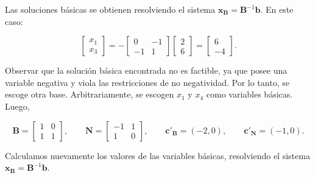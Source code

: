 \begin{enumerate}
    Las soluciones básicas se obtienen resolviendo el sistema $ \mathbf{x}_{\mathbf{B}} = \mathbf{B}^{-1}\mathbf{b}.$ En este caso:

    \begin{equation}
        \begin{bmatrix}
            x_1 \\
            x_3
        \end{bmatrix}
        = -
        \begin{bmatrix}
            0 & -1 \\
            -1 & 1
        \end{bmatrix}
        \begin{bmatrix}
            2 \\
            6
        \end{bmatrix}
        =
        \begin{bmatrix}
            6 \\
            -4
        \end{bmatrix}.
    \end{equation}

    Observar que la solución básica encontrada no es factible, ya que posee una variable negativa y viola las restricciones de no negatividad. Por lo tanto, se escoge otra base. Arbitrariamente, se escogen $x_1$ y $x_4$ como variables básicas. Luego,
    
    \begin{equation}
        \mathbf{B}
        =
        \begin{bmatrix}
            1 & 0 \\
            1 & 1
        \end{bmatrix},
        \qquad
        \mathbf{N}
        =
        \begin{bmatrix}
            -1 & 1 \\
            1 & 0
        \end{bmatrix},
        \qquad
        \mathbf{c}'_{\mathbf{B}} = (-2,0),
        \qquad
        \mathbf{c}'_{\mathbf{N}} = (-1,0).
    \end{equation}

    Calculamos nuevamente los valores de las variables básicas, resolviendo el sistema $ \mathbf{x}_{\mathbf{B}} = \mathbf{B}^{-1}\mathbf{b}.$
    

\end{enumerate}
